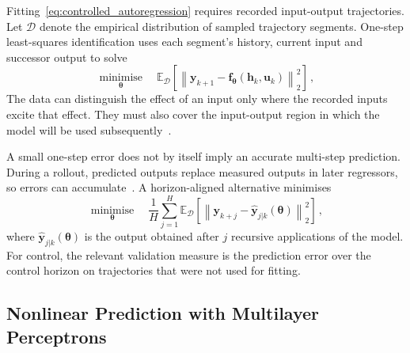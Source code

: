 Fitting~\eqref{eq:controlled_autoregression} requires recorded input-output trajectories. Let
$\mathcal{D}$ denote the empirical distribution of sampled trajectory segments. One-step
least-squares identification uses each segment's history, current input and successor output
to solve
%
\begin{equation}
    \underset{\boldsymbol{\theta}}{\operatorname{minimise}}
    \quad
    \mathbb{E}_{\mathcal{D}}\!\left[
      \left\|\mathbf{y}_{k+1}
      - \mathbf{f}_{\boldsymbol{\theta}}(\mathbf{h}_k,\mathbf{u}_k)\right\|_2^2
    \right] \,,
    \label{eq:one_step_identification}
\end{equation}
%
The data can distinguish the effect of an input only where the recorded inputs excite that
effect. They must also cover the input-output region in which the model will be used
subsequently~\cite[chaps.~13 and~16]{Ljung1999}. %

A small one-step error does not by itself imply an accurate multi-step prediction. During a
rollout, predicted outputs replace measured outputs in later regressors, so errors can
accumulate~\cite{Farina2011}. %
A horizon-aligned alternative minimises
%
\begin{equation}
    \underset{\boldsymbol{\theta}}{\operatorname{minimise}}
    \quad
    \frac{1}{H}
    \sum_{j=1}^{H}
    \mathbb{E}_{\mathcal{D}}\!\left[
      \left\|\mathbf{y}_{k+j}
      - \hat{\mathbf{y}}_{j|k}(\boldsymbol{\theta})\right\|_2^2
    \right] \,,
    \label{eq:multi_step_identification}
\end{equation}
%
where $\hat{\mathbf{y}}_{j|k}(\boldsymbol{\theta})$ is the output obtained after $j$ recursive
applications of the model. For control, the relevant validation measure is the prediction
error over the control horizon on trajectories that were not used for fitting.

\subsection{Nonlinear Prediction with Multilayer Perceptrons}

